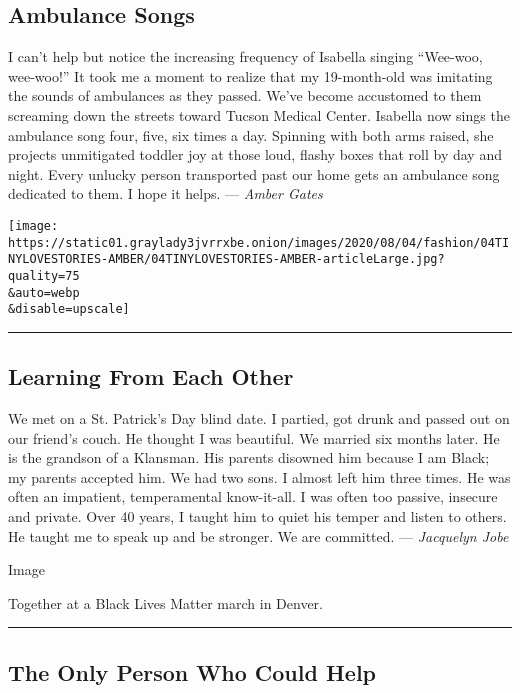 \hypertarget{ambulance-songs}{%
\subsection{Ambulance Songs}\label{ambulance-songs}}

I can't help but notice the increasing frequency of Isabella singing
``Wee-woo, wee-woo!'' It took me a moment to realize that my
19-month-old was imitating the sounds of ambulances as they passed.
We've become accustomed to them screaming down the streets toward Tucson
Medical Center. Isabella now sings the ambulance song four, five, six
times a day. Spinning with both arms raised, she projects unmitigated
toddler joy at those loud, flashy boxes that roll by day and night.
Every unlucky person transported past our home gets an ambulance song
dedicated to them. I hope it helps. --- \emph{Amber Gates}

\texttt{[image: https://static01.graylady3jvrrxbe.onion/images/2020/08/04/fashion/04TINYLOVESTORIES-AMBER/04TINYLOVESTORIES-AMBER-articleLarge.jpg?quality=75\\\&auto=webp\\\&disable=upscale]}

\begin{center}\rule{0.5\linewidth}{\linethickness}\end{center}

\hypertarget{learning-from-each-other}{%
\subsection{Learning From Each Other}\label{learning-from-each-other}}

We met on a St. Patrick's Day blind date. I partied, got drunk and
passed out on our friend's couch. He thought I was beautiful. We married
six months later. He is the grandson of a Klansman. His parents disowned
him because I am Black; my parents accepted him. We had two sons. I
almost left him three times. He was often an impatient, temperamental
know-it-all. I was often too passive, insecure and private. Over 40
years, I taught him to quiet his temper and listen to others. He taught
me to speak up and be stronger. We are committed. --- \emph{Jacquelyn
Jobe}

Image

Together at a Black Lives Matter march in Denver.

\begin{center}\rule{0.5\linewidth}{\linethickness}\end{center}

\hypertarget{the-only-person-who-could-help}{%
\subsection{The Only Person Who Could
Help}\label{the-only-person-who-could-help}}

